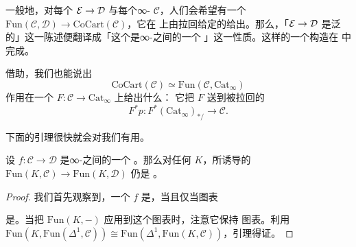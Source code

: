 \begin{remark}\label{rem:pullback-equivalence-rv}
一般地，对每个\trCocartesianFibration{} $\mathcal{E} \to \mathcal{D}$ 与每个∞-\trCategory{}%
$\mathcal{C}$，人们会希望有一个\trFunctor{}%
$\mathrm{Fun}(\mathcal{C}, \mathcal{D}) \to \mathrm{CoCart}(\mathcal{C})$，它在%
\trObject{}上由拉回给定的\trCocartesianFibration{}给出。那么，「$\mathcal{E} \to \mathcal{D}$
是泛的」这一陈述便翻译成「这个\trFunctor{}是∞-\trCategories{}之间的一个%
\trEquivalence{}」这一性质。这样的一个构造在 \cite[Theorem 6.1.13]{RV18} 中完成。
\end{remark}

\begin{remark}\label{rem:straightening-of-functor}
借助\trUniversalCocartesianFibration{}，我们也能说出\trEquivalence{}%
\[
\mathrm{CoCart}(\mathcal{C}) \simeq \mathrm{Fun}(\mathcal{C}, \mathrm{Cat}_\infty)
\]
作用在一个\trFunctor{} $F\colon \mathcal{C} \to \mathrm{Cat}_\infty$ 上给出什么：
它把 $F$ 送到被拉回的\trCocartesianFibration{}%
\[
F^*p\colon F^*(\mathrm{Cat}_\infty)_{*\!/} \to \mathcal{C}.
\]
\end{remark}

下面的引理很快就会对我们有用。

\begin{lemma}\label{lem:fun-preserves-fully-faithful}
设 $f\colon \mathcal{C} \to \mathcal{D}$ 是∞-\trCategories{}之间的一个%
\trFullyFaithful{}\trFunctor{}。那么对任何\trSimplicialSet{} $K$，所诱导的%
\trFunctor{} $\mathrm{Fun}(K, \mathcal{C}) \to \mathrm{Fun}(K, \mathcal{D})$ 仍是%
\trFullyFaithful{}。
\end{lemma}

\begin{proof}
我们首先观察到，一个\trFunctor{} $f$ 是\trFullyFaithful{}，当且仅当图表
\begin{center}
\end{center}
是\trHomotopyCartesian{}。当把\trFunctor{} $\mathrm{Fun}(K, -)$ 应用到这个图表时，注意它保持%
\trHomotopyCartesian{}图表。利用\trEquivalence{} $\mathrm{Fun}(K, \mathrm{Fun}(\Delta^1, \mathcal{C})) \cong \mathrm{Fun}(\Delta^1, \mathrm{Fun}(K, \mathcal{C}))$，引理得证。
\end{proof}


